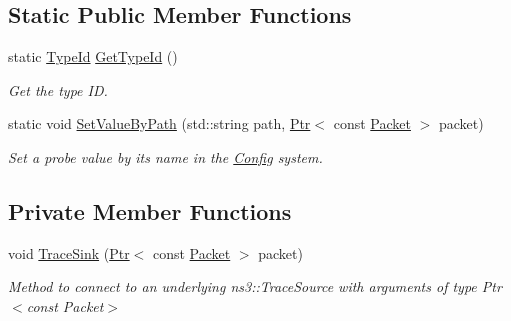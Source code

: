 \subsection*{Static Public Member Functions}
\begin{DoxyCompactItemize}
\item 
static \hyperlink{classns3_1_1TypeId}{Type\+Id} \hyperlink{classns3_1_1PacketProbe_a746586a5e8a94585ab820ec72fac8c82}{Get\+Type\+Id} ()
\begin{DoxyCompactList}\small\item\em Get the type ID. \end{DoxyCompactList}\item 
static void \hyperlink{classns3_1_1PacketProbe_aa040fed24fa9cc61133919de2f9fb386}{Set\+Value\+By\+Path} (std\+::string path, \hyperlink{classns3_1_1Ptr}{Ptr}$<$ const \hyperlink{classns3_1_1Packet}{Packet} $>$ packet)
\begin{DoxyCompactList}\small\item\em Set a probe value by its name in the \hyperlink{namespacens3_1_1Config}{Config} system. \end{DoxyCompactList}\end{DoxyCompactItemize}
\subsection*{Private Member Functions}
\begin{DoxyCompactItemize}
\item 
void \hyperlink{classns3_1_1PacketProbe_a8652b4d973d5702b88161ed2b129eb5e}{Trace\+Sink} (\hyperlink{classns3_1_1Ptr}{Ptr}$<$ const \hyperlink{classns3_1_1Packet}{Packet} $>$ packet)
\begin{DoxyCompactList}\small\item\em Method to connect to an underlying ns3\+::\+Trace\+Source with arguments of type Ptr$<$const Packet$>$ \end{DoxyCompactList}\end{DoxyCompactItemize}
